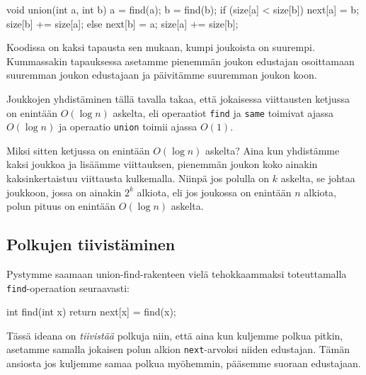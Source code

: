 \begin{code}
void union(int a, int b) {
    a = find(a);
    b = find(b);
    if (size[a] < size[b]) {
        next[a] = b;
        size[b] += size[a];
    } else {
        next[b] = a;
        size[a] += size[b];
    }
}
\end{code}

Koodissa on kaksi tapausta sen mukaan, kumpi joukoista on suurempi.
Kummassakin tapauksessa asetamme pienemmän joukon edustajan
osoittamaan suuremman joukon edustajaan ja päivitämme suuremman
joukon koon.

Joukkojen yhdistäminen tällä tavalla takaa, että jokaisessa
viittausten ketjussa on enintään $O(\log n)$ askelta,
eli operaatiot \texttt{find} ja \texttt{same} toimivat
ajassa $O(\log n)$ ja operaatio \texttt{union} toimii ajassa $O(1)$.

Miksi sitten ketjussa on enintään $O(\log n)$ askelta?
Aina kun yhdistämme kaksi joukkoa ja lisäämme viittauksen,
pienemmän joukon koko ainakin kaksinkertaistuu viittausta kulkemalla.
Niinpä jos polulla on $k$ askelta, se johtaa joukkoon,
jossa on ainakin $2^k$ alkiota, eli jos joukossa on enintään $n$
alkiota, polun pituus on enintään $O(\log n)$ askelta.

\subsection{Polkujen tiivistäminen}

Pystymme saamaan union-find-rakenteen vielä tehokkaammaksi
toteuttamalla \texttt{find}-operaation seuraavasti:

\begin{code}
int find(int x) {
    return next[x] = find(x);
}
\end{code}

Tässä ideana on \emph{tiivistää} polkuja niin,
että aina kun kuljemme polkua pitkin, asetamme samalla
jokaisen polun alkion \texttt{next}-arvoksi niiden edustajan.
Tämän ansiosta jos kuljemme samaa polkua myöhemmin, 
pääsemme suoraan edustajaan.

